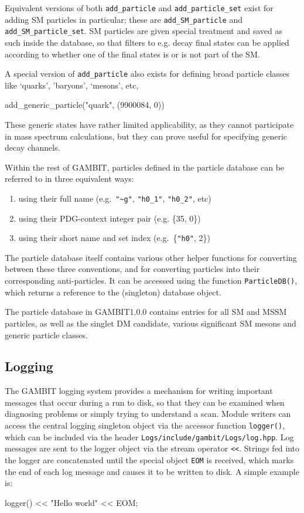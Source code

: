 \documentclass[pdftex,twocolumn,epjc3_preprint,runningheads]{svjour3}
\renewcommand{\_}{\discretionary{\underscore}{}{\underscore}}
\newcommand\cpp[1]{{\lstinline!#1!}}  %
\newcommand\term[1]{{\lstset{style=terminal}\lstinline!#1!\lstset{style=cpp}}}
\newcommand{\gambit}{\textsf{GAMBIT}\xspace}
\newcommand{\GB}{\gambit}
\begin{document}
Equivalent versions of both \lstinline{add_particle} and \lstinline{add_particle_set} exist for adding SM particles in particular; these are \lstinline{add_SM_particle} and \lstinline{add_SM_particle_set}.  SM particles are given special treatment and saved as such inside the database, so that filters to e.g. decay final states can be applied according to whether one of the final states is or is not part of the SM.

A special version of \lstinline{add_particle} also exists for defining broad particle classes like `quarks', 'baryons', `mesons', etc,
\begin{lstcpp}
add_generic_particle("quark", (9900084, 0))
\end{lstcpp}
These generic states have rather limited applicability, as they cannot participate in mass spectrum calculations, but they can prove useful for specifying generic decay channels.

Within the rest of \GB, particles defined in the particle database can be referred to in three equivalent ways:
\begin{enumerate}
\item using their full name (e.g.\ \lstinline{"~g"}, \lstinline{"h0_1"}, \lstinline{"h0_2"}, etc)
\item using their PDG-context integer pair (e.g. \{35, 0\})
\item using their short name and set index (e.g.\ \{\lstinline{"h0"}, 2\})
\end{enumerate}
The particle database itself contains various other helper functions for converting between these three conventions, and for converting particles into their corresponding anti-particles.  It can be accessed using the function \mbox{\cpp{ParticleDB()},} which returns a reference to the (singleton) database object.

The particle database in \GB \textsf{1.0.0} contains entries for all SM and MSSM particles, as well as the singlet DM candidate, various significant SM mesons and generic particle classes.

\subsection{Logging}
\label{logs}

The \GB logging system provides a mechanism for writing important messages that occur during a run to disk, so that they can be examined when diagnosing problems or simply trying to understand a scan. Module writers can access the central logging singleton object via the accessor function \mbox{\cpp{logger()},} which can be included via the header \term{Logs/include/gambit/Logs/log.hpp}. Log messages are sent to the logger object via the stream operator \lstinline{<<}. Strings fed into the logger are concatenated until the special object \lstinline{EOM} is received, which marks the end of each log message and causes it to be written to disk. A simple example is:
\begin{lstcpp}
logger() << "Hello world" << EOM;
\end{lstcpp}
\end{document}
